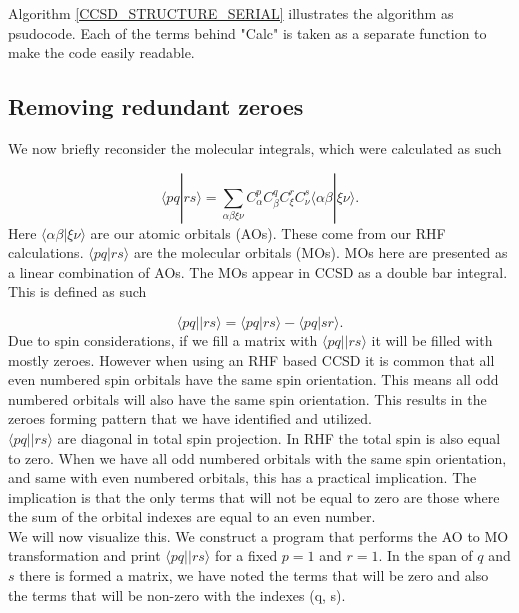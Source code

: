 \documentclass[a4paper,norsk,11pt,twoside]{report}
\begin{document}
Algorithm \ref{CCSD_STRUCTURE_SERIAL} illustrates the algorithm as psudocode. Each of the terms behind "Calc" is taken as a separate function to make the code easily readable. 

\subsection{Removing redundant zeroes \label{compact_storage}}
We now briefly reconsider the molecular integrals, which were calculated as such

\begin{equation}
\langle pq|rs \rangle = 
\sum_{\alpha \beta \xi \nu} C_{\alpha}^p C_{\beta}^q C_{\xi}^r C_{\nu}^s \langle \alpha \beta | \xi \nu \rangle .
\end{equation}
Here $\langle \alpha \beta | \xi \nu \rangle$ are our atomic orbitals (AOs). These come from our RHF calculations. $\langle pq|rs \rangle$ are the molecular orbitals (MOs). MOs here are presented as a linear combination of AOs. The MOs appear in CCSD as a double bar integral. This is defined as such

\begin{equation}
\langle pq||rs \rangle = \langle pq | rs \rangle
- \langle pq | sr \rangle  .
\end{equation}
Due to spin considerations, if we fill a matrix with $\langle pq||rs \rangle$ it will be filled with mostly zeroes. However when using an RHF based CCSD it is common that all even numbered spin orbitals have the same spin orientation. This means all odd numbered orbitals will also have the same spin orientation. This results in the zeroes forming pattern that we have identified and utilized. \\

$\langle pq || rs \rangle$ are diagonal in total spin projection. In RHF the total spin is also equal to zero. When we have all odd numbered orbitals with the same spin orientation, and same with even numbered orbitals, this has a practical implication. The implication is that the only terms that will not be equal to zero are those where the sum of the orbital indexes are equal to an even number. \\

We will now visualize this. We construct a program that performs the AO to MO transformation and print $\langle pq||rs \rangle$ for a fixed $p=1$ and $r=1$. In the span of $q$ and $s$ there is formed a matrix, we have noted the terms that will be zero and also the terms that will be non-zero with the indexes (q, s).
\end{document}
